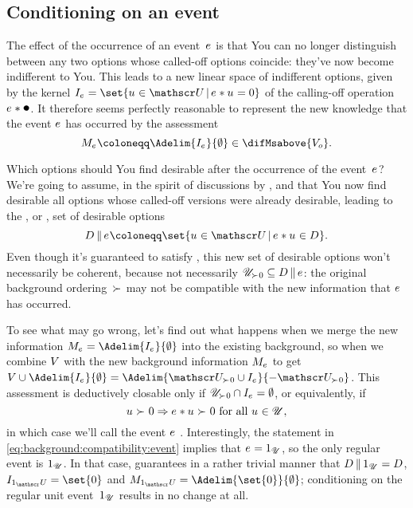 \documentclass[preprint]{isipta2025}
\begin{document}
\subsection{Conditioning on an event}\label{sec::conditioning:event}
The effect of the occurrence of an event~\(e_{}\) is that You can no longer distinguish between any two options whose called-off options coincide: they've now become indifferent to You.
This leads to a new linear space of indifferent options, given by the kernel \(\eventindifset=\set{\opt\in\opts\given\calledoff{\opt}=0}\) of the calling-off operation~\(\calledoff{\bolleke}\).
It therefore seems perfectly reasonable to represent the new knowledge that the event \(e_{}\) has occurred by the assessment
\begin{equation}\label{eq:model:for:event}
\eventM
\coloneqq\Adelim{\eventindifset}{\emptyset}\in\difMsabove{\zeroM}.
\end{equation}

Which options should You find desirable after the occurrence of the event~\(e_{}\)?
We're going to assume, in the spirit of discussions by \citeauthor{finetti1937} \cite{finetti1937,finetti19745}, \citeauthor{williams2007} \cite{williams2007} and \citeauthor{walley2000} \cite{walley2000} that You now find desirable all options whose called-off versions were already desirable, leading to the , or , set of desirable options
\begin{equation}\label{eq:updated:desirable}
\desirset\altcondon\eventopt
\coloneqq\set{\opt\in\opts\given\calledoff{\opt}\in\desirset}.
\end{equation}
Even though it's guaranteed to satisfy , this new set of desirable options won't necessarily be coherent, because not necessarily \(\posopts\subseteq\desirset\altcondon\eventopt\): the original background ordering~\(\mathrel{\succ_{}}\) may not be compatible with the new information that \(e_{}\) has occurred.

To see what may go wrong, let's find out what happens when we merge the new information \(\eventM=\Adelim{\eventindifset}{\emptyset}\) into the existing background, so when we combine \(V\) with the new background information \(M_{e_{}}\) to get \(\bgM\union\Adelim{\eventindifset}{\emptyset}=\Adelim{\posopts\cup\eventindifset}{-\posopts}\).
This assessment is deductively closable only if \(\mathscr{U}_{\mathrel{\succ_{}}0}\cap I_{{e_{}}}=\emptyset\), or equivalently, if
\begin{equation}\label{eq:background:compatibility:event}
u_{}\mathrel{\succ_{}}0\Rightarrow e_{}\ast u_{}\mathrel{\succ_{}}0
\text{ for all~\(u_{}\in\mathscr{U}\)},
\end{equation}
in which case we'll call the event \(e_{}\) .
Interestingly, the statement in \cref{eq:background:compatibility:event} implies that \(e_{}=1_{\mathscr{U}}\), so the only regular event is \(1_{\mathscr{U}}\).
In that case,  guarantees in a rather trivial manner that \(\desirset\altcondon\uniteventopt=\desirset\), \(\indifset[\uniteventopt]=\set{0}\) and \(\M_{\uniteventopt}=\Adelim{\set{0}}{\emptyset}\); conditioning on the regular unit event~\(1_{\mathscr{U}}\) results in no change at all.
\end{document}
